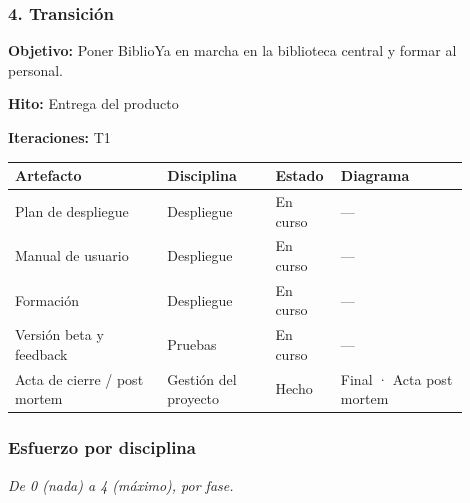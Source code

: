 \subsubsection*{4. Transición}

\textbf{Objetivo:} Poner BiblioYa en marcha en la biblioteca central y formar al personal.

\textbf{Hito:} Entrega del producto

\textbf{Iteraciones:} T1

{\small
\begin{longtable}{@{}>{\raggedright\arraybackslash}p{0.311\linewidth}>{\raggedright\arraybackslash}p{0.224\linewidth}>{\raggedright\arraybackslash}p{0.096\linewidth}>{\raggedright\arraybackslash}p{0.267\linewidth}@{}}
\toprule
\textbf{Artefacto} & \textbf{Disciplina} & \textbf{Estado} & \textbf{Diagrama} \\
\midrule
\endhead
Plan de despliegue & Despliegue & En curso & — \\
Manual de usuario & Despliegue & En curso & — \\
Formación & Despliegue & En curso & — \\
Versión beta y feedback & Pruebas & En curso & — \\
Acta de cierre / post mortem & Gestión del proyecto & Hecho & Final · Acta post mortem \\
\bottomrule
\end{longtable}}

\subsubsection*{Esfuerzo por disciplina}

\emph{De 0 (nada) a 4 (máximo), por fase.}

